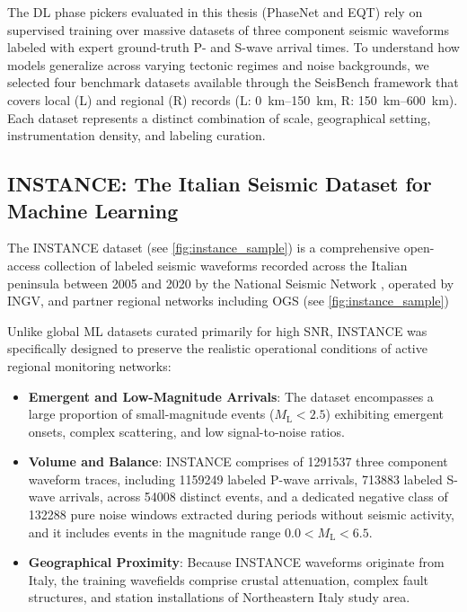 The \ac{DL} phase pickers evaluated in this thesis (\ac{PhaseNet} and \ac{EQT})
rely on supervised training over massive datasets of three component seismic
waveforms labeled with expert ground-truth P- and S-wave arrival times. To
understand how models generalize across varying tectonic regimes and noise
backgrounds, we selected four benchmark datasets available through the
SeisBench framework \parencite{SeisBench} that covers local (L) and
regional (R) records (L: \qtyrange{0}{150}{\kilo\meter}, R:
\qtyrange{150}{600}{\kilo\meter}). Each dataset represents a distinct
combination of scale, geographical setting, instrumentation density, and
labeling curation.

\subsection{INSTANCE: The Italian Seismic Dataset for Machine Learning}
\label{subsec:instance}

The \acf{INSTANCE} dataset (see \cref{fig:instance_sample}) is a comprehensive
open-access collection of labeled seismic waveforms recorded across the Italian
peninsula between 2005 and 2020 by the National Seismic Network
\parencite{RSN}, operated by \ac{INGV}, and partner regional networks including
\ac{OGS} (see \cref{fig:instance_sample})

Unlike global \ac{ML} datasets curated primarily for high \ac{SNR},
\ac{INSTANCE} was specifically designed to preserve the realistic operational
conditions of active regional monitoring networks:
\begin{itemize}
  \item \textbf{Emergent and Low-Magnitude Arrivals}: The dataset
    encompasses a large proportion of small-magnitude events
    ($M_{\mathrm{L}} < \num{2.5}$) exhibiting emergent onsets, complex
    scattering, and low signal-to-noise ratios.
  \item \textbf{Volume and Balance}: \ac{INSTANCE} comprises of \num{1291537}
    three component waveform traces, including \num{1159249} labeled P-wave
    arrivals, \num{713883} labeled S-wave arrivals, across \num{54008} distinct
    events, and a dedicated negative class of \num{132288} pure noise windows
    extracted during periods without seismic activity, and it includes events
    in the magnitude range $0.0 < M_{\mathrm{L}} < \num{6.5}$.
  \item \textbf{Geographical Proximity}: Because \ac{INSTANCE} waveforms
    originate from Italy, the training wavefields comprise crustal attenuation,
    complex fault structures, and station installations of Northeastern Italy
    study area.
\end{itemize}

